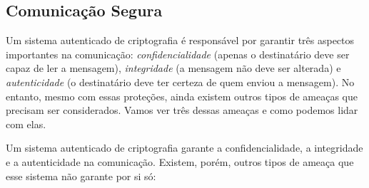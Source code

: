 \subsection{Comunicação Segura}
\label{sec:comunicacao-segura}

Um sistema autenticado de criptografia é responsável por garantir três aspectos importantes na comunicação:
{\em confidencialidade} (apenas o destinatário deve ser capaz de ler a mensagem), {\em integridade} (a mensagem não deve ser alterada) e {\em autenticidade} (o destinatário deve ter certeza de quem enviou a mensagem).
No entanto, mesmo com essas proteções, ainda existem outros tipos de ameaças que precisam ser considerados.
Vamos ver três dessas ameaças e como podemos lidar com elas.



Um sistema autenticado de criptografia garante a confidencialidade, a integridade e a autenticidade na comunicação.
Existem, porém, outros tipos de ameaça que esse sistema não garante por si só:
